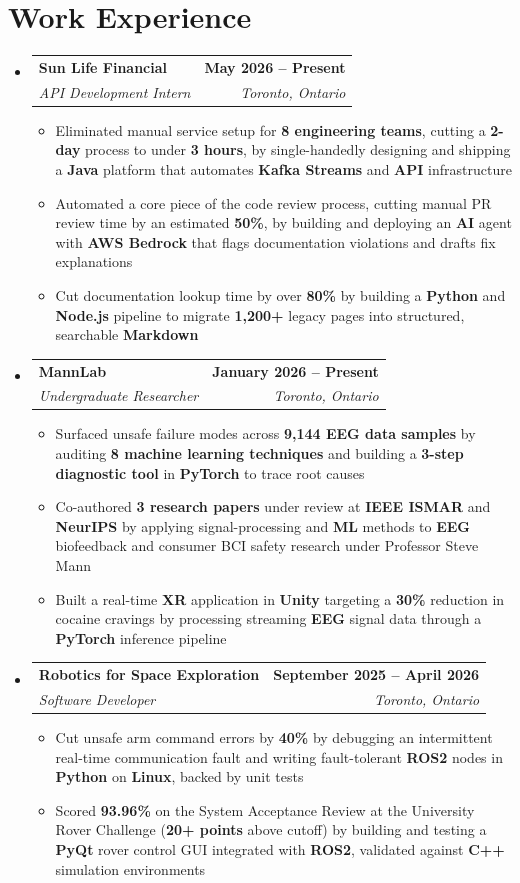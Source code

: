\documentclass[letterpaper,10pt]{article}
\makeatletter
\newcommand{\resumeItem}[1]{
  \item\small{
    {#1 \vspace{0pt}}
  }
}
\newcommand{\resumeSubheading}[4]{
  \vspace{-2pt}\item
    \begin{tabular*}{1.0\textwidth}[t]{l@{\extracolsep{\fill}}r}
      \textbf{#1} & \textbf{\small #2} \\
      \textit{\small#3} & \textit{\small #4} \\
    \end{tabular*}\vspace{-7pt}
}
\newcommand{\resumeSubHeadingListStart}{\begin{itemize}[leftmargin=0.0in, label={}]}
\newcommand{\resumeSubHeadingListEnd}{\end{itemize}}\vspace{0pt}
\newcommand{\resumeItemListStart}{\begin{itemize}}
\newcommand{\resumeItemListEnd}{\end{itemize}\vspace{-5pt}}
\makeatother
\begin{document}
\section{Work Experience}
    \resumeSubHeadingListStart
                \resumeSubheading{Sun Life Financial}{May 2026 -- Present}{API Development Intern}{Toronto, Ontario}
                \resumeItemListStart
                    \resumeItem{Eliminated manual service setup for \textbf{8 engineering teams}, cutting a \textbf{2-day} process to under \textbf{3 hours}, by single-handedly designing and shipping a \textbf{Java} platform that automates \textbf{Kafka Streams} and \textbf{API} infrastructure}
                    \resumeItem{Automated a core piece of the code review process, cutting manual PR review time by an estimated \textbf{50\%}, by building and deploying an \textbf{AI} agent with \textbf{AWS Bedrock} that flags documentation violations and drafts fix explanations}
                    \resumeItem{Cut documentation lookup time by over \textbf{80\%} by building a \textbf{Python} and \textbf{Node.js} pipeline to migrate \textbf{1,200+} legacy pages into structured, searchable \textbf{Markdown}}
                    \resumeItemListEnd
                \resumeSubheading{MannLab}{January 2026 -- Present}{Undergraduate Researcher}{Toronto, Ontario}
                \resumeItemListStart
                    \resumeItem{Surfaced unsafe failure modes across \textbf{9,144 EEG data samples} by auditing \textbf{8 machine learning techniques} and building a \textbf{3-step diagnostic tool} in \textbf{PyTorch} to trace root causes}
                    \resumeItem{Co-authored \textbf{3 research papers} under review at \textbf{IEEE ISMAR} and \textbf{NeurIPS} by applying signal-processing and \textbf{ML} methods to \textbf{EEG} biofeedback and consumer BCI safety research under Professor Steve Mann}
                    \resumeItem{Built a real-time \textbf{XR} application in \textbf{Unity} targeting a \textbf{30\%} reduction in cocaine cravings by processing streaming \textbf{EEG} signal data through a \textbf{PyTorch} inference pipeline}
                    \resumeItemListEnd
                \resumeSubheading{Robotics for Space Exploration}{September 2025 -- April 2026}{Software Developer}{Toronto, Ontario}
                \resumeItemListStart
                    \resumeItem{Cut unsafe arm command errors by \textbf{40\%} by debugging an intermittent real-time communication fault and writing fault-tolerant \textbf{ROS2} nodes in \textbf{Python} on \textbf{Linux}, backed by unit tests}
                    \resumeItem{Scored \textbf{93.96\%} on the System Acceptance Review at the University Rover Challenge (\textbf{20+ points} above cutoff) by building and testing a \textbf{PyQt} rover control GUI integrated with \textbf{ROS2}, validated against \textbf{C++} simulation environments}
                    \resumeItemListEnd
    \resumeSubHeadingListEnd
    \vspace{-12pt}
\end{document}
